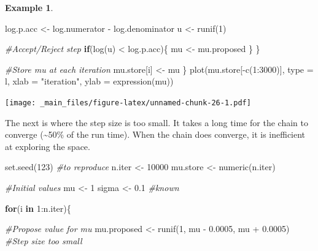 \documentclass[
]{book}
\newenvironment{Shaded}{\begin{snugshade}}{\end{snugshade}}
\newcommand{\AttributeTok}[1]{\textcolor[rgb]{0.77,0.63,0.00}{#1}}
\newcommand{\CommentTok}[1]{\textcolor[rgb]{0.56,0.35,0.01}{\textit{#1}}}
\newcommand{\ControlFlowTok}[1]{\textcolor[rgb]{0.13,0.29,0.53}{\textbf{#1}}}
\newcommand{\DecValTok}[1]{\textcolor[rgb]{0.00,0.00,0.81}{#1}}
\newcommand{\FloatTok}[1]{\textcolor[rgb]{0.00,0.00,0.81}{#1}}
\newcommand{\FunctionTok}[1]{\textcolor[rgb]{0.00,0.00,0.00}{#1}}
\newcommand{\NormalTok}[1]{#1}
\newcommand{\OtherTok}[1]{\textcolor[rgb]{0.56,0.35,0.01}{#1}}
\newcommand{\SpecialCharTok}[1]{\textcolor[rgb]{0.00,0.00,0.00}{#1}}
\newcommand{\StringTok}[1]{\textcolor[rgb]{0.31,0.60,0.02}{#1}}
\theoremstyle{definition}
\theoremstyle{definition}
\newtheorem{example}{Example}[chapter]
\theoremstyle{definition}
\theoremstyle{definition}
\theoremstyle{remark}
\begin{document}
\begin{example}
\begin{Shaded}
\begin{Highlighting}[]
\NormalTok{    log.p.acc }\OtherTok{\textless{}{-}}\NormalTok{ log.numerator }\SpecialCharTok{{-}}\NormalTok{ log.denominator}
\NormalTok{    u }\OtherTok{\textless{}{-}} \FunctionTok{runif}\NormalTok{(}\DecValTok{1}\NormalTok{)}
    
    \CommentTok{\#Accept/Reject step}
    \ControlFlowTok{if}\NormalTok{(}\FunctionTok{log}\NormalTok{(u) }\SpecialCharTok{\textless{}}\NormalTok{ log.p.acc)\{}
\NormalTok{      mu }\OtherTok{\textless{}{-}}\NormalTok{ mu.proposed}
\NormalTok{    \}}
\NormalTok{  \}}
  
  \CommentTok{\#Store mu at each iteration}
\NormalTok{  mu.store[i] }\OtherTok{\textless{}{-}}\NormalTok{ mu}
\NormalTok{\}}
\FunctionTok{plot}\NormalTok{(mu.store[}\SpecialCharTok{{-}}\FunctionTok{c}\NormalTok{(}\DecValTok{1}\SpecialCharTok{:}\DecValTok{3000}\NormalTok{)], }\AttributeTok{type =} \StringTok{\textquotesingle{}l\textquotesingle{}}\NormalTok{, }\AttributeTok{xlab =} \StringTok{"iteration"}\NormalTok{, }\AttributeTok{ylab =} \FunctionTok{expression}\NormalTok{(mu))}
\end{Highlighting}
\end{Shaded}

\texttt{[image: \_main\_files/figure-latex/unnamed-chunk-26-1.pdf]}

The next is where the step size is too small. It takes a long time for the chain to converge (\textasciitilde50\% of the run time). When the chain does converge, it is inefficient at exploring the space.

\begin{Shaded}
\begin{Highlighting}[]
\FunctionTok{set.seed}\NormalTok{(}\DecValTok{123}\NormalTok{) }\CommentTok{\#to reproduce}
\NormalTok{n.iter   }\OtherTok{\textless{}{-}} \DecValTok{10000}
\NormalTok{mu.store }\OtherTok{\textless{}{-}} \FunctionTok{numeric}\NormalTok{(n.iter)}

\CommentTok{\#Initial values}
\NormalTok{mu }\OtherTok{\textless{}{-}} \DecValTok{1} 
\NormalTok{sigma }\OtherTok{\textless{}{-}} \FloatTok{0.1} \CommentTok{\#known}

\ControlFlowTok{for}\NormalTok{(i }\ControlFlowTok{in} \DecValTok{1}\SpecialCharTok{:}\NormalTok{n.iter)\{}
  
  \CommentTok{\#Propose value for mu}
\NormalTok{  mu.proposed }\OtherTok{\textless{}{-}} \FunctionTok{runif}\NormalTok{(}\DecValTok{1}\NormalTok{, mu }\SpecialCharTok{{-}} \FloatTok{0.0005}\NormalTok{, mu }\SpecialCharTok{+} \FloatTok{0.0005}\NormalTok{) }\CommentTok{\#Step size too small}
  

\end{Highlighting}
\end{Shaded}
\end{example}
\end{document}
